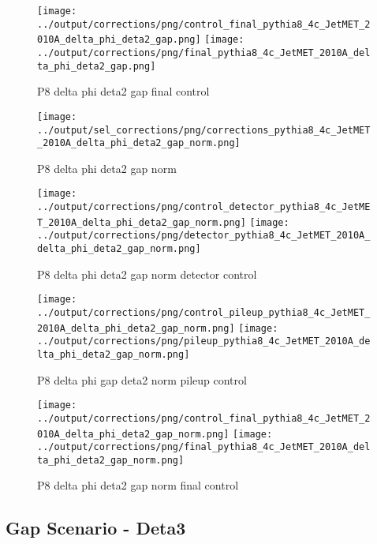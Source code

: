 \documentclass[11pt]{book}
\begin{document}
\begin{figure}[ht]
\centering
\texttt{[image: ../output/corrections/png/control\_final\_pythia8\_4c\_JetMET\_2010A\_delta\_phi\_deta2\_gap.png]}
\texttt{[image: ../output/corrections/png/final\_pythia8\_4c\_JetMET\_2010A\_delta\_phi\_deta2\_gap.png]}
\caption{P8 delta phi deta2 gap final control}
\label{fig:p8_JetMET_2010A_delta_phi_deta2_gap_final_control}
\end{figure}


\begin{figure}[ht]
\centering
\texttt{[image: ../output/sel\_corrections/png/corrections\_pythia8\_4c\_JetMET\_2010A\_delta\_phi\_deta2\_gap\_norm.png]}
\caption{P8 delta phi deta2 gap norm}
\label{fig:p8_JetMET_2010A_delta_phi_deta2_gap_norm}
\end{figure}


\begin{figure}[ht]
\centering
\texttt{[image: ../output/corrections/png/control\_detector\_pythia8\_4c\_JetMET\_2010A\_delta\_phi\_deta2\_gap\_norm.png]}
\texttt{[image: ../output/corrections/png/detector\_pythia8\_4c\_JetMET\_2010A\_delta\_phi\_deta2\_gap\_norm.png]}
\caption{P8 delta phi deta2 gap norm detector control}
\label{fig:p8_JetMET_2010A_delta_phi_deta2_gap_norm_detector_control}
\end{figure}

\begin{figure}[ht]
\centering
\texttt{[image: ../output/corrections/png/control\_pileup\_pythia8\_4c\_JetMET\_2010A\_delta\_phi\_deta2\_gap\_norm.png]}
\texttt{[image: ../output/corrections/png/pileup\_pythia8\_4c\_JetMET\_2010A\_delta\_phi\_deta2\_gap\_norm.png]}
\caption{P8 delta phi gap deta2 norm pileup control}
\label{fig:p8_JetMET_2010A_delta_phi_deta2_gap_norm_pileup_control}
\end{figure}


\begin{figure}[ht]
\centering
\texttt{[image: ../output/corrections/png/control\_final\_pythia8\_4c\_JetMET\_2010A\_delta\_phi\_deta2\_gap\_norm.png]}
\texttt{[image: ../output/corrections/png/final\_pythia8\_4c\_JetMET\_2010A\_delta\_phi\_deta2\_gap\_norm.png]}
\caption{P8 delta phi deta2 gap norm final control}
\label{fig:p8_JetMET_2010A_delta_phi_deta2_gap_norm_final_control}
\end{figure}


\clearpage
\subsection{Gap Scenario - Deta3}
\end{document}
